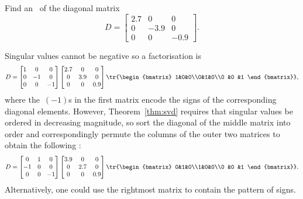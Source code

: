 \begin{example} \label{eg:}
Find an \svd\ of the diagonal matrix
\begin{equation*}
D=\begin{bmatrix} 2.7&0&0\\0&-3.9&0\\0& 0 &-0.9 \end{bmatrix}.
\end{equation*}
\begin{solution} 
Singular values cannot be negative so a factorisation is
\begin{equation*}
D=\begin{bmatrix} 1&0&0\\0&-1&0\\0 &0 &-1 \end{bmatrix}
\begin{bmatrix} 2.7&0&0\\0&3.9&0\\0 &0 &0.9 \end{bmatrix}
\tr{\begin{bmatrix} 1&0&0\\0&1&0\\0 &0 &1 \end{bmatrix}},
\end{equation*}
where the~\((-1)\)s in the first matrix encode the signs of the corresponding diagonal elements.
However, Theorem~\ref{thm:svd} requires that  singular values be ordered in decreasing magnitude, so sort the diagonal of the middle matrix into order and correspondingly permute the columns of the outer two matrices to obtain the following \svd: 
\begin{equation*}
D=\begin{bmatrix} 0&1&0\\-1&0&0\\0 &0 &-1 \end{bmatrix}
\begin{bmatrix} 3.9&0&0\\0&2.7&0\\0 &0 &0.9 \end{bmatrix}
\tr{\begin{bmatrix} 0&1&0\\1&0&0\\0 &0 &1 \end{bmatrix}}.
\end{equation*} 
Alternatively, one could use the rightmost matrix to contain the pattern of signs.
\end{solution}
\end{example}



